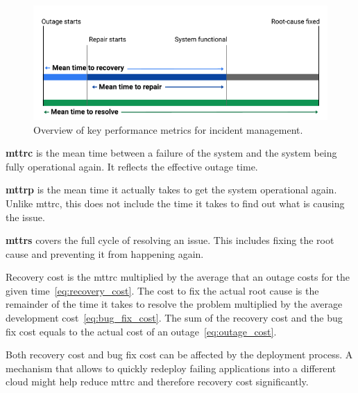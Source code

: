 \documentclass[../main.tex]{subfiles}
\begin{document}
    \begin{figure}[h]
        \centering
        \includegraphics[width=0.95\linewidth]{img/concepts_eval_mttx_v2.png}
        \captionsetup{justification=centering}
        \caption{
            Overview of key performance metrics for incident management.\cite{atlassian_inc_metrics}
        }
        \label{fig:mttx_metrics}
    \end{figure}

    \textbf{\Acrfull{mttrc}}
    is the mean time between a failure of the system and the system being fully operational again.
    It reflects the effective outage time.\cite{atlassian_inc_metrics}

    \textbf{\Acrfull{mttrp}}
    is the mean time it actually takes to get the system operational again.
    Unlike \acrshort{mttrc}, this does not include the time it takes to find out what is causing the issue.\cite{atlassian_inc_metrics}

    \textbf{\Acrfull{mttrs}}
    covers the full cycle of resolving an issue.
    This includes fixing the root cause and preventing it from happening again.\cite{atlassian_inc_metrics}

    Recovery cost is the \acrlong{mttrc} multiplied by the average that an outage costs for the given time~\eqref{eq:recovery_cost}.
    The cost to fix the actual root cause is the remainder of the time it takes to resolve the problem multiplied by the average development cost~\eqref{eq:bug_fix_cost}.
    The sum of the recovery cost and the bug fix cost equals to the actual cost of an outage~\eqref{eq:outage_cost}.

    

    Both recovery cost and bug fix cost can be affected by the deployment process.
    A mechanism that allows to quickly redeploy failing applications into a different \gls{cloud} might help reduce \acrlong{mttrc} and therefore recovery cost significantly.
\end{document}
